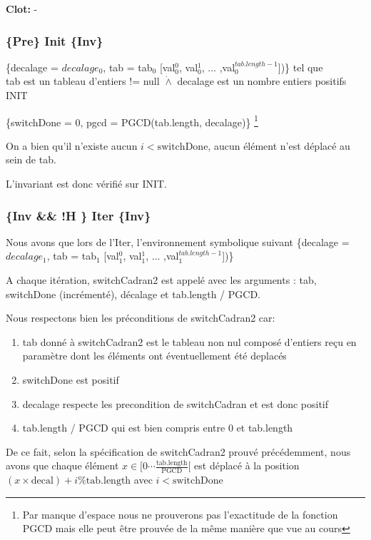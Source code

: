 \noindent \textbf{Clot: } -

\subsubsection*{\{Pre\} Init \{Inv\}}

\{decalage = $decalage_{0}$, tab = tab$_{0}$ [val$_{0}^{0}$, val$_{0}^{1}$, ... ,val$_{0}^{tab.length-1}$])\} tel que \\tab est un tableau d'entiers != null
$\dot{\wedge}$ decalage est un nombre entiers positifs\\

INIT

\{switchDone = 0, pgcd = PGCD(tab.length, decalage)\} \footnote{Par manque d'espace nous ne prouverons pas l'exactitude de la fonction PGCD mais elle peut être prouvée de la même manière que vue au cours}

On a bien qu'il n'existe aucun $i < \mathrm{switchDone}$, aucun élément n'est déplacé au sein de tab.

L'invariant est donc vérifié sur INIT.

\subsubsection*{\{Inv \&\& !H \} Iter \{Inv\}}

Nous avons que lors de l'Iter, l'environnement symbolique suivant \{decalage = $decalage_{1}$, tab = tab$_{1}$ [val$_{1}^{0}$, val$_{1}^{1}$, ... ,val$_{1}^{tab.length-1}$])\}

A chaque itération, switchCadran2 est appelé avec les arguments : tab,
switchDone (incrémenté), décalage et tab.length / PGCD.

Nous respectons bien les préconditions de switchCadran2 car:
\begin{enumerate}
 \item tab donné à switchCadran2 est le tableau non nul composé d'entiers reçu en paramètre dont les éléments ont éventuellement été deplacés
 \item switchDone est positif
 \item decalage respecte les precondition de switchCadran et est donc positif
 \item tab.length / PGCD qui est bien compris entre 0 et tab.length
\end{enumerate}


De ce fait,
selon la spécification de switchCadran2 prouvé précédemment, nous avons
que chaque élément $x \in [0\cdots
    \frac{\mathrm{tab.length}}{\mathrm{PGCD}}[$ est déplacé à la
        position $(x\times \mathrm{decal})+i \% \mathrm{tab.length}$ avec $i < \mathrm{switchDone}$

